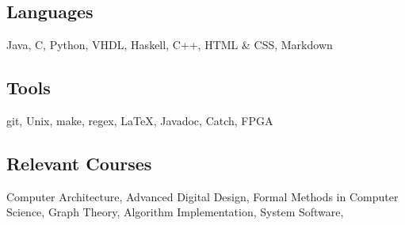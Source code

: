 \documentclass[18pt]{article}
\providecommand{\tightlist}{
    \setlength{\itemsep}{0pt}\setlength{\parskip}{0pt}
}
\begin{document}
  \subsection*{Languages}\label{languages}
  Java,
  C,
  Python,
  VHDL,
  Haskell,
  C++,
  HTML \& CSS,
  Markdown
  
  \subsection*{Tools}\label{tools}
  git,
  Unix,
  make,
  regex,
  \LaTeX,
  Javadoc,
  Catch,
  FPGA
  
  \subsection*{Relevant Courses}\label{relevant-courses}
      Computer Architecture,
      Advanced Digital Design,
      Formal Methods in Computer Science,
      Graph Theory,
      Algorithm Implementation,
      System Software,
    
\end{document}
